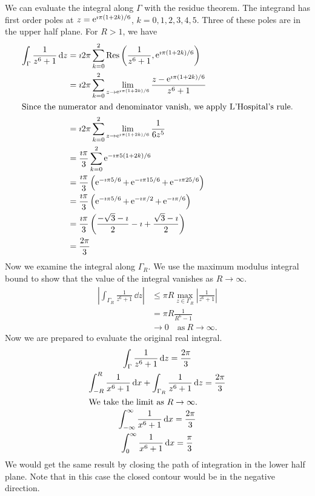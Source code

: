 {\begin{Solution}
  We can evaluate the integral along $\Gamma$ with the residue theorem.
  The integrand has first order poles at $z = \mathop{\mathrm{e}}\nolimits^{\imath \pi (1 + 2 k) / 6}$, 
  $k = 0,1,2,3,4,5$.  Three of these poles are in the upper half plane.
  For  $R > 1$, we have
  \begin{align*}
    \int_\Gamma \frac{1}{z^6+1} \,\mathrm{d} z
    &= \imath 2 \pi \sum_{k = 0}^2 
    \mathop{\mathrm{Res}}\nolimits\left( \frac{1}{z^6+1}, \mathop{\mathrm{e}}\nolimits^{\imath \pi (1 + 2 k) / 6} \right) \\
    &= \imath 2 \pi \sum_{k = 0}^2 
    \lim_{z \to \mathop{\mathrm{e}}\nolimits^{\imath \pi (1 + 2 k) / 6} } 
    \frac{z - \mathop{\mathrm{e}}\nolimits^{\imath \pi (1 + 2 k) / 6}}{z^6+1} \\
    \intertext{Since the numerator and denominator vanish, we apply 
      L'Hospital's rule.}
    &= \imath 2 \pi \sum_{k = 0}^2 
    \lim_{z \to \mathop{\mathrm{e}}\nolimits^{\imath \pi (1 + 2 k) / 6} } \frac{1}{6 z^5} \\
    &= \frac{\imath \pi}{3} \sum_{k = 0}^2 \mathop{\mathrm{e}}\nolimits^{- \imath \pi 5 (1 + 2 k) / 6} \\
    &= \frac{\imath \pi}{3} \left( \mathop{\mathrm{e}}\nolimits^{- \imath \pi 5 / 6}
      + \mathop{\mathrm{e}}\nolimits^{- \imath \pi 15 / 6} + \mathop{\mathrm{e}}\nolimits^{- \imath \pi 25 / 6} \right) \\
    &= \frac{\imath \pi}{3} \left( \mathop{\mathrm{e}}\nolimits^{- \imath \pi 5 / 6}
      + \mathop{\mathrm{e}}\nolimits^{- \imath \pi / 2} + \mathop{\mathrm{e}}\nolimits^{- \imath \pi / 6} \right) \\
    &= \frac{\imath \pi}{3} \left( \frac{-\sqrt{3} - \imath}{2}
      - \imath + \frac{\sqrt{3} - \imath}{2} \right) \\
    &= \frac{2 \pi}{3}
  \end{align*}
  Now we examine the integral along $\Gamma_R$.
  We use the maximum modulus integral bound to show that the value of the 
  integral vanishes as $R \to \infty$.
  \begin{align*}
    \left| \int_{\Gamma_R} \frac{1}{z^6+1} \,\dd z \right|
    &\leq \pi R \max_{z \in \Gamma_R} \left| \frac{1}{z^6+1} \right| \\
    &= \pi R \frac{1}{R^6-1} \\
    &\to 0 \quad \mathrm{as}\ R \to \infty.
  \end{align*}
  Now we are prepared to evaluate the original real integral.
  \begin{gather*}
    \int_\Gamma \frac{1}{z^6+1} \,\mathrm{d} z = \frac{2 \pi}{3} \\
    \int_{-R}^R \frac{1}{x^6 + 1} \,\mathrm{d} x +
    \int_{\Gamma_R} \frac{1}{z^6+1} \,\mathrm{d} z = \frac{2 \pi}{3} \\
    \intertext{We take the limit as $R \to \infty$.}
    \int_{-\infty}^\infty \frac{1}{x^6 + 1} \,\mathrm{d} x = \frac{2 \pi}{3} \\
    \int_0^\infty \frac{1}{x^6 + 1} \,\mathrm{d} x = \frac{\pi}{3} 
  \end{gather*}
  We would get the same result by closing the path of integration in
  the lower half plane.  Note that in this case the closed contour would
  be in the negative direction.



\end{Solution}}

